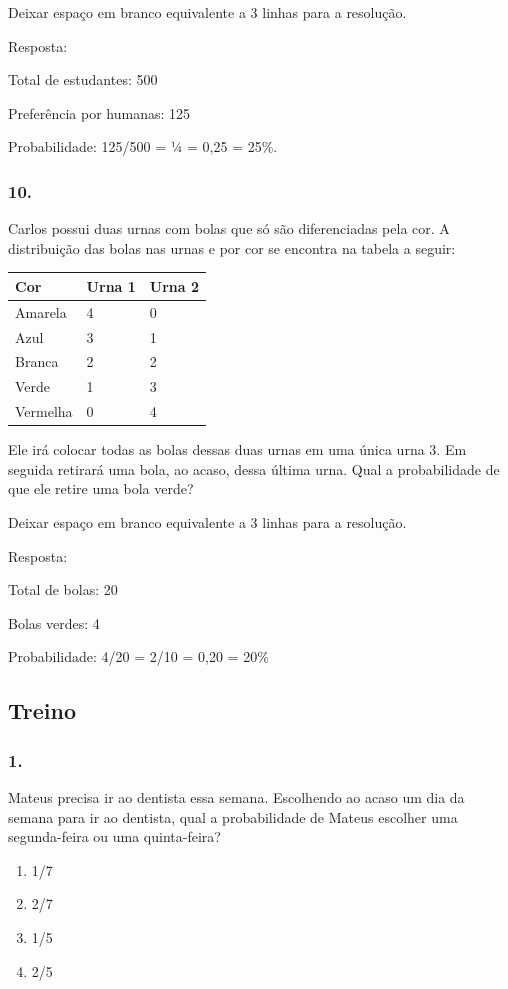 Deixar espaço em branco equivalente a 3 linhas para a resolução.

Resposta:

Total de estudantes: 500

Preferência por humanas: 125

Probabilidade: 125/500 = ¼ = 0,25 = 25\%.

\subsubsection{10.}\label{section-104}

Carlos possui duas urnas com bolas que só são diferenciadas pela cor. A
distribuição das bolas nas urnas e por cor se encontra na tabela a
seguir:

\begin{longtable}[]{@{}lll@{}}
\toprule
Cor & Urna 1 & Urna 2\tabularnewline
\midrule
\endhead
Amarela & 4 & 0\tabularnewline
Azul & 3 & 1\tabularnewline
Branca & 2 & 2\tabularnewline
Verde & 1 & 3\tabularnewline
Vermelha & 0 & 4\tabularnewline
\bottomrule
\end{longtable}

Ele irá colocar todas as bolas dessas duas urnas em uma única urna 3. Em
seguida retirará uma bola, ao acaso, dessa última urna. Qual a
probabilidade de que ele retire uma bola verde?

Deixar espaço em branco equivalente a 3 linhas para a resolução.

Resposta:

Total de bolas: 20

Bolas verdes: 4

Probabilidade: 4/20 = 2/10 = 0,20 = 20\%

\subsection{Treino}\label{treino-6}

\subsubsection{1.}\label{section-105}

Mateus precisa ir ao dentista essa semana. Escolhendo ao acaso um dia da
semana para ir ao dentista, qual a probabilidade de Mateus escolher uma
segunda-feira ou uma quinta-feira?

\begin{enumerate}
\def\labelenumi{\alph{enumi})}
\item
  1/7
\item
  2/7
\item
  1/5
\item
  2/5
\end{enumerate}


